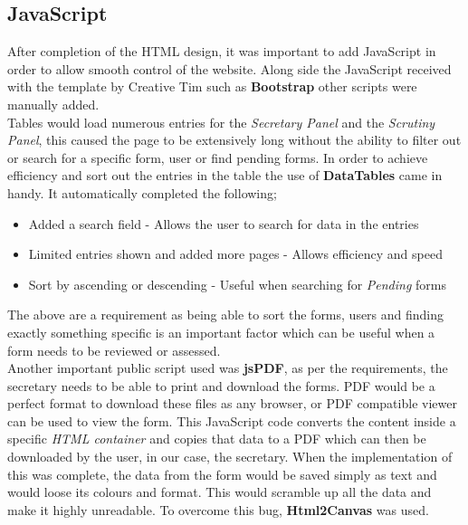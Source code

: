 \documentclass[../main.tex]{subfiles}
\begin{document}
\subsection{JavaScript}
After completion of the HTML design, it was important to add JavaScript in order to allow smooth control of the website. Along side the JavaScript received with the template by Creative Tim\cite{creativeTimTemplate} such as \textbf{Bootstrap}\cite{bootstrapfour} other scripts were manually added.  \\[4mm]

Tables would load numerous entries for the \textit{Secretary Panel} and the \textit{Scrutiny Panel}, this caused the page to be extensively long without the ability to filter out or search for a specific form, user or find pending forms. In order to achieve efficiency and sort out the entries in the table the use of \textbf{DataTables}\cite{datatables} came in handy. It automatically completed the following;
\begin{itemize}
  \item Added a search field - Allows the user to search for data in the entries
  \item Limited entries shown and added more pages - Allows efficiency and speed
  \item Sort by ascending or descending - Useful when searching for \textit{Pending} forms
\end{itemize}

The above are a requirement as being able to sort the forms, users and finding exactly something specific is an important factor which can be useful when a form needs to be reviewed or assessed. \\[4mm]

Another important public script used was \textbf{jsPDF}\cite{jsPDF}, as per the requirements, the secretary needs to be able to print and download the forms. PDF would be a perfect format to download these files as any browser, or PDF compatible viewer can be used to view the form. This JavaScript code converts the content inside a specific \textit{HTML container} and copies that data to a PDF which can then be downloaded by the user, in our case, the secretary. When the implementation of this was complete, the data from the form would be saved simply as text and would loose its colours and format. This would scramble up all the data and make it highly unreadable. To overcome this bug, \textbf{Html2Canvas} was used. \\[4mm]
\end{document}
